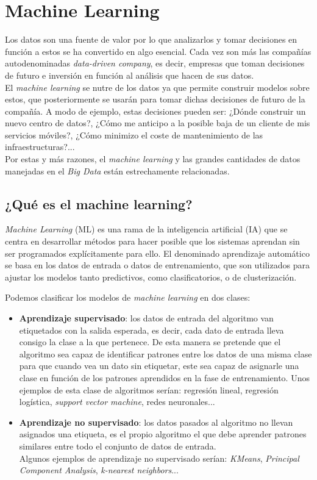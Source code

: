 \chapter{Machine Learning}
Los datos son una fuente de valor por lo que analizarlos y tomar decisiones en función a estos se ha
convertido en algo esencial. Cada vez son más las compañías autodenominadas 
\textit{data-driven company}, es decir, empresas que toman decisiones de 
futuro e inversión en función al análisis que hacen de sus datos.\\
El \textit{machine learning} se nutre de los datos ya que permite construir modelos sobre estos,
que posteriormente se usarán para tomar dichas decisiones de futuro de la compañía. A modo de ejemplo, estas
decisiones pueden ser: ¿Dónde construir un nuevo centro de datos?, ¿Cómo me anticipo a la posible baja de un
cliente de mis servicios móviles?, ¿Cómo minimizo el coste de mantenimiento de las infraestructuras?...\\
Por estas y más razones, el \textit{machine learning} y las grandes cantidades de datos manejadas en el 
\textit{Big Data} están estrechamente relacionadas.

\section{¿Qué es el machine learning?}
\textit{Machine Learning} (ML) es una rama de la inteligencia artificial (IA) 
que se centra en desarrollar métodos para hacer posible que los sistemas aprendan sin ser programados 
explícitamente para ello.
El denominado aprendizaje automático se basa en los datos de entrada o datos de entrenamiento, que
son utilizados para ajustar los modelos tanto predictivos, como clasificatorios, o de clusterización.

Podemos clasificar los modelos de \textit{machine learning} en dos clases:
\begin{itemize}
  \item \textbf{Aprendizaje supervisado}: los datos de entrada del 
  algoritmo van etiquetados con la salida esperada, es decir, cada dato de entrada lleva consigo 
  la clase a la que pertenece. De esta manera se pretende que el algoritmo sea capaz de identificar 
  patrones entre los datos de una misma clase para que cuando vea un dato sin etiquetar, este sea 
  capaz de asignarle una clase en función de los patrones aprendidos en la fase de entrenamiento.
  Unos ejemplos de esta clase de algoritmos serían: regresión lineal, regresión logística, 
  \textit{support vector machine}, redes neuronales...
  
  \item \textbf{Aprendizaje no supervisado}: los datos pasados 
  al algoritmo no llevan asignados una etiqueta, es el propio algoritmo el que debe aprender 
  patrones similares entre todo el conjunto de datos de entrada.\\
  Algunos ejemplos de aprendizaje no supervisado serían: \textit{KMeans}, \textit{Principal Component Analysis}, 
  \textit{k-nearest neighbors}...
\end{itemize}

